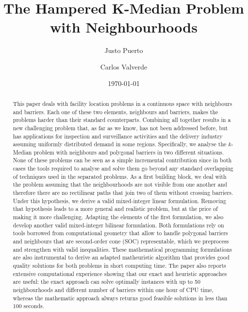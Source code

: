 \documentclass[a4paper,  review, authoryear, 1p.]{elsarticle}
\newcommand{\JP}[1]{{\color{blue}#1}}
\begin{document}
	
	\begin{frontmatter}
		
		\title{The Hampered K-Median Problem with Neighbourhoods}
		
		\author[1]{Justo Puerto}%
		\author[2]{Carlos Valverde}
		
		\address[1]{Institute of Mathematics (IMUS) and Department of Statistics and Operations Research, University of Seville, Seville, 41012, Spain}
		\address[2]{Institute of Mathematics (IMUS) and Department of Statistics and Operations Research, University of Seville, Seville, 41012, Spain}
		
		
		\date{\today}
		
		
		\begin{abstract}
			This paper deals with facility location problems in a continuous space with neighbours and barriers. Each one of these two elements, neighbours and barriers, makes the problems harder than their standard counterparts. Combining all together results in a new challenging problem that, as far as we know, has not been addressed before, but has applications for inspection and surveillance activities and the delivery industry assuming uniformly distributed demand in some regions. Specifically, we analyse the $k$-Median problem with neighbours and polygonal barriers in two different situations. \JP{None of these problems can be  seen as a simple incremental contribution since in both cases the tools required to analyse and solve them go beyond any standard overlapping of techniques used in the separated problems.} As a first building block, we deal with the problem assuming that the neighbourhoods are not visible from one another and therefore there are no rectilinear paths that join two of them without crossing barriers. Under this hypothesis, we derive a valid mixed-integer linear formulation. Removing that hypothesis leads to a more general and realistic problem, but at the price of making it more challenging. Adapting the elements of the first formulation, we also develop another valid mixed-integer bilinear formulation.  \JP{Both formulations rely on tools borrowed from computational geometry} that allow to handle polygonal barriers and neighbours that are second-order cone (SOC) representable, which we preprocess and strengthen with valid inequalities. These mathematical programming formulations are also instrumental to derive an adapted matheuristic algorithm that provides good quality solutions for both problems in short computing time. The paper also reports extensive computational experience showing that our exact and heuristic approaches are useful: the exact approach can solve optimally instances with up to 50 neighbourhoods and different number of barriers within one hour of CPU time, whereas the mathematic approach always returns good feasible solutions in less than 100 seconds.
		\end{abstract}
		

\end{frontmatter}
\end{document}
